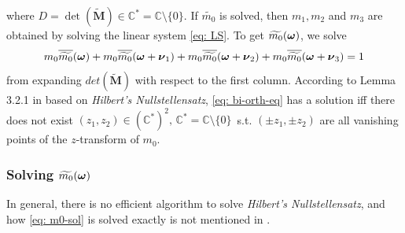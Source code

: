 where $ D = \det(\widetilde{\mathbf{M}})\in \mathbb{C}^* = \mathbb{C}\setminus\{0\}$.
If $\widetilde{m_0}$ is solved, then $m_1,m_2$ and $m_3$ are obtained by solving the linear system \eqref{eq: LS}.
To get $\widetilde{m_{0}}(\boldsymbol{\omega})$, we solve 
\begin{align}\label{eq: bi-orth-eq}
m_0\overline{\widetilde{m_{0}}}(\boldsymbol{\omega}) + m_0\overline{\widetilde{m_{0}}}(\boldsymbol{\omega} + \boldsymbol{\nu}_{1}) + m_0\overline{\widetilde{m_{0}}}(\boldsymbol{\omega} + \boldsymbol{\nu}_{2}) + m_0\overline{\widetilde{m_{0}}}(\boldsymbol{\omega} + \boldsymbol{\nu}_{3}) = 1
\end{align}
from expanding $det(\widetilde{\mathbf{M}})$ with respect to the first column.
According to Lemma 3.2.1 in \cite{cohen1993compactly} based on {\it Hilbert's Nullstellensatz}, \eqref{eq: bi-orth-eq} has a solution iff there does not exist $(z_1,z_2)\in (\mathbb{C}^*)^2,\, \mathbb{C}^* = \mathbb{C}\setminus\{0\}$\, s.t. $(\pm z_1,\pm z_2)$ are all 
vanishing points of the $z$-transform of $m_0$.

\subsubsection{Solving $\widetilde{m_{0}}(\boldsymbol{\omega})$}
In general, there is no efficient algorithm to solve {\it Hilbert's Nullstellensatz}, and how \eqref{eq: m0-sol} is solved exactly is not mentioned in \cite{cohen1993compactly}.

